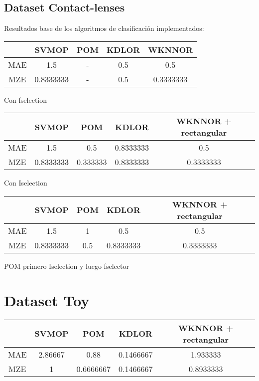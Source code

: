 \subsection{Dataset Contact-lenses}
Resultados base de los algoritmos de clasificación implementados:
\begin{center}
\begin{tabular}{ c c c c c }
	& SVMOP & POM & KDLOR & WKNNOR \\
	\hline	
	MAE &	1.5 & - & 0.5  & 0.5 \\
	MZE &	0.8333333 & - & 0.5 & 0.3333333  \\
	\hline  
\end{tabular}
\end{center}
Con fselection

\begin{tabular}{ c c c c c }
	& SVMOP & POM & KDLOR & WKNNOR + rectangular \\
	\hline	
	MAE &      	1.5 & 0.5 & 0.8333333  & 0.5 \\
	MZE &	0.8333333 & 0.333333 & 0.8333333 & 0.3333333  \\
	\hline  
\end{tabular}

Con Iselection

\begin{tabular}{ c c c c c }
	& SVMOP & POM & KDLOR & WKNNOR + rectangular \\
	\hline	
	MAE &      	1.5 & 1 & 0.5  & 0.5 \\
	MZE &	0.8333333 & 0.5 & 0.8333333 & 0.3333333  \\
	\hline  
\end{tabular}

POM primero Iselection y luego fselector

\section{Dataset Toy}

\begin{tabular}{ c c c c c }
	& SVMOP & POM & KDLOR & WKNNOR + rectangular \\
	\hline	
	MAE &   2.86667  & 	0.88 &  0.1466667  & 1.933333 \\
	MZE &	1     &  0.6666667 & 0.1466667 & 0.8933333  \\
	\hline  
\end{tabular}


